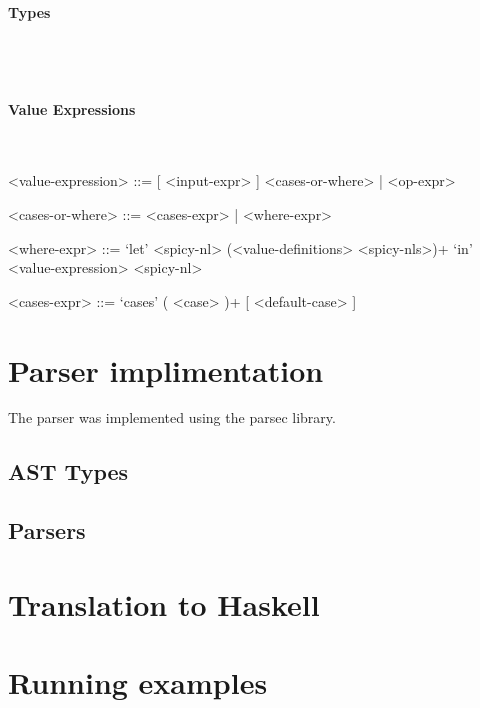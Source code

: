 \documentclass{article}
\def\H{Haskell}
\begin{document}
\paragraph{Types}

\hspace{1cm}\\


\hspace{1cm}\\

\paragraph{Value Expressions}

\hspace{1cm}\\
\begin{grammar}

<value-expression> ::= [ <input-expr> ] <cases-or-where> | <op-expr>

<cases-or-where> ::= <cases-expr> | <where-expr>

<where-expr> ::=
`let' <spicy-nl> (<value-definitions> <spicy-nls>)+ `in' <value-expression> <spicy-nl>

<cases-expr> ::= `cases' ( <case> )+ [ <default-case> ]

\end{grammar}

\section{Parser implimentation}

The parser was implemented using the parsec library.

\subsection{AST Types}

\subsection{Parsers}

\section{Translation to \H}
\section{Running examples}
\end{document}
